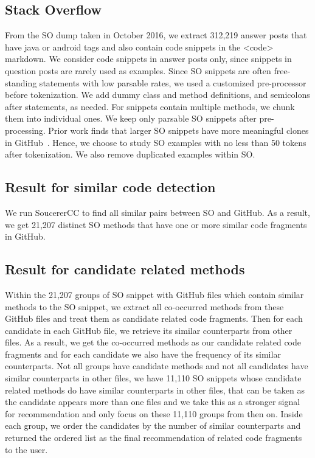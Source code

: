 \subsection{Stack Overflow}
From the SO dump taken in October 2016, we extract 312,219 answer posts that have java or android tags and also contain code snippets in the {\ttt <code>} markdown. We consider code snippets in answer posts only, since snippets in question posts are rarely used as examples. Since SO snippets are often free-standing statements with low parsable rates, we used a customized pre-processor before tokenization. We add dummy class and method definitions, and semicolons after statements, as needed. For snippets contain multiple methods, we chunk them into individual ones. We keep only parsable SO snippets after pre-processing. Prior work finds that larger SO snippets have more meaningful clones in GitHub~\cite{yang2017stack}. Hence, we choose to study SO examples with no less than 50 tokens after tokenization. We also remove duplicated examples within SO.%

\subsection{Result for similar code detection}
We run SoucererCC to find all similar pairs between SO and GitHub. As a result, we get 21,207 distinct SO methods that have one or more similar code fragments in GitHub. 

\subsection{Result for candidate related methods}
Within the 21,207 groups of SO snippet with GitHub files which contain similar methods to the SO snippet, we extract all co-occurred methods from these GitHub files and treat them as candidate related code fragments. Then for each candidate in each GitHub file, we retrieve its similar counterparts from other files. As a result, we get the co-occurred methods as our candidate related code fragments and for each candidate we also have the frequency of its similar counterparts. Not all groups have candidate methods and not all candidates have similar counterparts in other files, we have 11,110 SO snippets whose candidate related methods do have similar counterparts in other files, that can be taken as the candidate appears more than one files and we take this as a stronger signal for recommendation and only focus on these 11,110 groups from then on. Inside each group, we order the candidates by the number of similar counterparts and returned the ordered list as the final recommendation of related code fragments to the user. 

